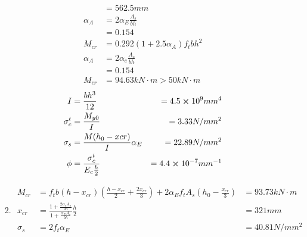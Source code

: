 \documentclass{article}
\begin{document}
\begin{enumerate}
\begin{enumerate}[1.]
\begin{enumerate}
\begin{align*}
                                           & =562.5mm                                                                                  \\
                                  \alpha_A & =2\alpha_E\frac{A_s}{bh}                                                                  \\
                                           & =0.154                                                                                    \\
                                  M_{cr}   & =0.292(1+2.5\alpha_A)f_tbh^2                                                              \\
                                  \alpha_A & =2\alpha_e\frac{A_s}{bh}                                                                  \\
                                           & =0.154                                                                                    \\
                                  M_{cr}   & =94.63kN\cdot m >50kN\cdot m
                              \end{align*}
                              \begin{align*}
                                  I          & =\frac{bh^3}{12}                   & =4.5\cross10^9mm^4       \\
                                  \sigma_c^t & =\frac{M_{y0}}{I}                  & =3.33N/mm^2              \\
                                  \sigma_s   & =\frac{M(h_0-x{cr})}{I}\alpha_E    & =22.89N/mm^2             \\
                                  \phi       & =\frac{\sigma_c^t}{E_c\frac{h}{2}} & =4.4\cross10^{-7}mm^{-1}
                              \end{align*}
                              \item\begin{align*}
                                  M_{cr}     & =f_tb(h-x_{cr})(\frac{h-x_{cr}}{2}+\frac{2x_{cr}}{3})+2\alpha_Ef_tA_s(h_0-\frac{x_{cr}}{3}) & =93.73kN\cdot m               \\
                                  x_{cr}     & =\frac{1+\frac{2\alpha_eA_s}{bh}}{1+\frac{\alpha_EA_s}{bh}}\frac{h}{2}                      & =321mm                        \\
                                  \sigma_s   & =2f_t\alpha_E                                                                               & =40.81N/mm^2                  \\

\end{align*}
\end{enumerate}
\end{enumerate}
\end{enumerate}
\end{document}
